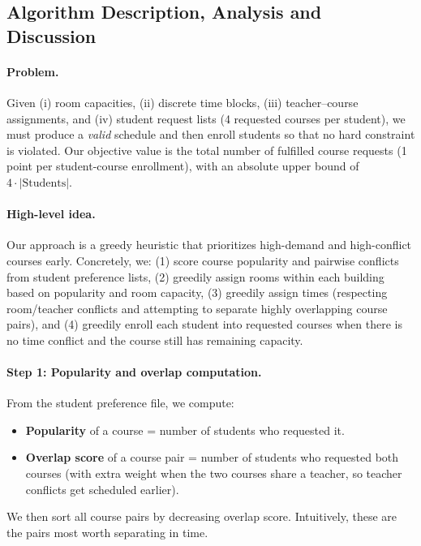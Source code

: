 
\subsection{Algorithm Description, Analysis and Discussion}\label{sec:algorithm}

\paragraph{Problem.}
Given (i) room capacities, (ii) discrete time blocks, (iii) teacher--course assignments, and (iv) student request lists (4 requested courses per student), we must produce a \emph{valid} schedule and then enroll students so that no hard constraint is violated. Our objective value is the total number of fulfilled course requests (1 point per student-course enrollment), with an absolute upper bound of $4 \cdot |\text{Students}|$.

\paragraph{High-level idea.}
Our approach is a greedy heuristic that prioritizes high-demand and high-conflict courses early. Concretely, we:
(1) score course popularity and pairwise conflicts from student preference lists,
(2) greedily assign rooms within each building based on popularity and room capacity,
(3) greedily assign times (respecting room/teacher conflicts and attempting to separate highly overlapping course pairs), and
(4) greedily enroll each student into requested courses when there is no time conflict and the course still has remaining capacity.

\paragraph{Step 1: Popularity and overlap computation.}
From the student preference file, we compute:
\begin{itemize}
  \item \textbf{Popularity} of a course = number of students who requested it.
  \item \textbf{Overlap score} of a course pair = number of students who requested both courses (with extra weight when the two courses share a teacher, so teacher conflicts get scheduled earlier).
\end{itemize}
We then sort all course pairs by decreasing overlap score. Intuitively, these are the pairs most worth separating in time.

